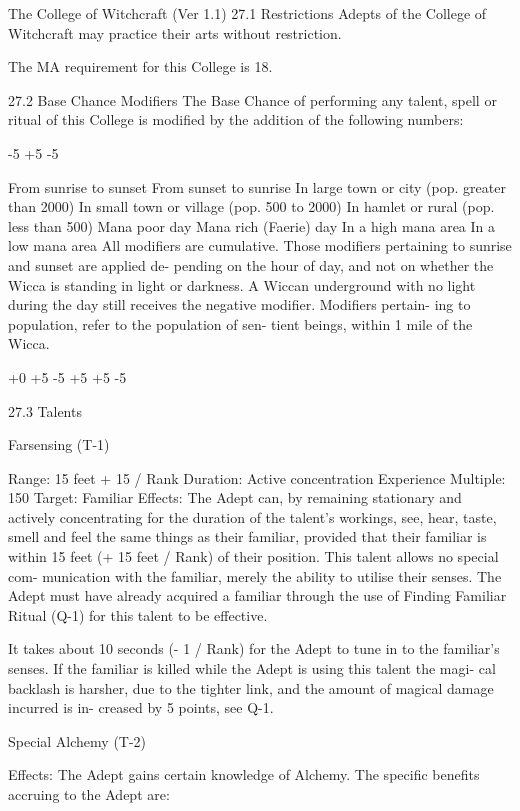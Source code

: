 \begin{Chapter}{The College of Witchcraft (Ver 1.1)}
27.1 Restrictions 
Adepts  of  the  College  of  Witchcraft  may  practice 
their arts without restriction. 

The MA requirement for this College is 18. 

27.2 Base Chance Modifiers 
The Base Chance of performing any talent, spell or 
ritual of this College is modified by the addition of 
the following numbers: 

-5 
+5 
-5 

From sunrise to sunset 
From sunset to sunrise 
In large town or city (pop. greater than 
2000) 
In small town or village (pop. 500 to 2000)  
In hamlet or rural (pop. less than 500)  
Mana poor day 
Mana rich (Faerie) day 
In a high mana area 
In a low mana area 
All  modifiers  are  cumulative.  Those  modifiers 
pertaining  to  sunrise  and  sunset  are  applied  de-
pending on the hour of day, and not on whether the 
Wicca  is  standing  in  light  or  darkness.  A  Wiccan 
underground  with  no  light  during  the  day  still 
receives  the  negative  modifier.  Modifiers  pertain-
ing  to  population,  refer  to  the  population  of  sen-
tient beings, within 1 mile of the Wicca. 

+0 
+5 
-5 
 +5 
+5 
-5 

27.3 Talents 

Farsensing (T-1) 

Range: 15 feet + 15 / Rank 
Duration: Active concentration 
Experience Multiple: 150 
Target: Familiar 
Effects:  The  Adept  can,  by  remaining  stationary 
and  actively  concentrating  for  the  duration  of  the 
talent’s  workings,  see,  hear,  taste,  smell  and  feel 
the  same  things  as  their  familiar,  provided  that 
their familiar is within 15 feet (+ 15 feet / Rank) of 
their  position.  This  talent  allows  no  special  com-
munication  with the  familiar,  merely  the  ability  to 
utilise  their  senses.  The  Adept  must  have  already 
acquired  a  familiar  through  the  use  of  Finding 
Familiar Ritual (Q-1) for this talent to be effective. 

It takes about 10 seconds (- 1 / Rank) for the Adept 
to tune in to the familiar’s senses. If the familiar is 
killed while the Adept is using this talent the magi-
cal backlash is harsher, due to the tighter link, and 
the  amount  of  magical  damage  incurred  is  in-
creased by 5 points, see Q-1. 

Special Alchemy (T-2) 

Effects:  The  Adept  gains  certain  knowledge  of 
Alchemy.  The  specific  benefits  accruing  to  the 
Adept are: 


\end{Chapter}
